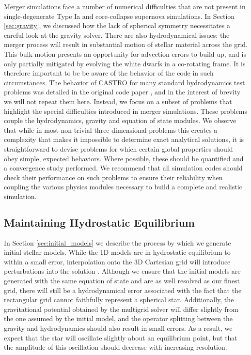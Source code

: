 \documentclass[12pt,preprint]{aastex}
\begin{document}
Merger simulations face a number of numerical difficulties that are not present in single-degenerate Type Ia and core-collapse supernova simulations. In Section \ref{sec:gravity}, we discussed how the lack of spherical symmetry necessitates a careful look at the gravity solver. There are also hydrodynamical issues: the merger process will result in substantial motion of stellar material across the grid. This bulk motion presents an opportunity for advection errors to build up, and is only partially mitigated by evolving the white dwarfs in a co-rotating frame. It is therefore important to be be aware of the behavior of the code in such circumstances. The behavior of CASTRO for many standard hydrodynamics test problems was detailed in the original code paper \citep{castro}, and in the interest of brevity we will not repeat them here. Instead, we focus on a subset of problems that highlight the special difficulties introduced in merger simulations. These problems couple the hydrodynamics, gravity and equation of state modules. We observe that while in most non-trivial three-dimensional problems this creates a complexity that makes it impossible to determine exact analytical solutions, it is straightforward to devise problems for which certain global properties should obey simple, expected behaviors. Where possible, these should be quantified and a convergence study performed. We recommend that all simulation codes should check their performance on such problems to ensure their reliability when coupling the various physics modules necessary to build a complete and realistic simulation.

\subsection{Maintaining Hydrostatic Equilibrium}\label{sec:HSE}

In Section \ref{sec:initial_models} we describe the process by which we generate initial stellar models. While the 1D models are in hydrostatic equilibrium to within a small error, interpolation onto the 3D Cartesian grid will introduce perturbations into the solution \citep{zingale:2002}. Although we ensure that the initial models are generated with the same equation of state and are as well resolved as our finest grid, there will still be a hydrodynamical error associated with the fact that the rectangular grid cannot faithfully represent a spherical star. Additionally, the gravitational potential obtained by the multigrid solver will differ slightly from the one assumed by the initial model, and the operator splitting between the gravity and hydrodynamics should also result in small errors. As a result, we expect that the star will oscillate slightly about an equilibrium point, but that the amplitude of this oscillation should decrease with increasing resolution.
\end{document}
